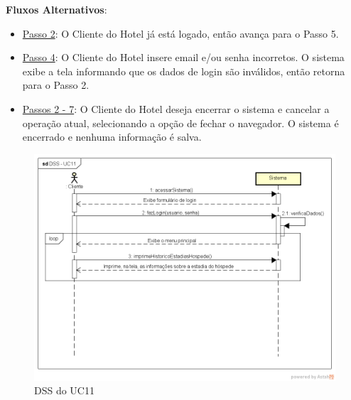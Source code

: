 \documentclass[notitlepage]{article}
\begin{document}
\textbf{Fluxos Alternativos}:\\
\begin{itemize}
\item \underline{Passo 2}: O Cliente do Hotel já está logado, então avança para o Passo 5.
\item \underline{Passo 4}: O Cliente do Hotel insere email e/ou senha incorretos. O sistema exibe a tela informando que os dados de login são inválidos, então retorna para o Passo 2.
\item \underline{Passos 2 - 7}: O Cliente do Hotel deseja encerrar o sistema e cancelar a operação atual, selecionando a opção de fechar o navegador. O sistema é encerrado e nenhuma informação é salva.  
\end{itemize}
\begin{figure}[!htbp]
	\centering
  \includegraphics[scale=0.65]{UC11.png}
  \caption{DSS do UC11}
  \label{fig:UC11}
\end{figure}

\clearpage
\tableofcontents
\end{document}
